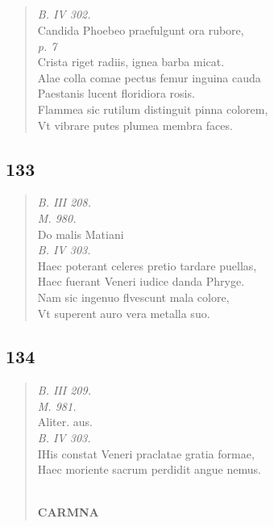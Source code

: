 \documentclass[11pt, a4paper]{report}
\begin{document}
            \subsection*{}
      \begin{verse}
      \textit{B. IV 302.} \\ Candida Phoebeo praefulgunt ora rubore, \\ \textit{p. 7} \\ Crista riget radiis, ignea barba micat. \\ Alae colla comae pectus femur inguina cauda \\ Paestanis lucent floridiora rosis. \\ Flammea sic rutilum distinguit pinna colorem, \\ Vt vibrare putes plumea membra faces. \\ 
      \end{verse}
  
            \subsection*{133}
      \begin{verse}
      \textit{B. III 208.} \\ \textit{M. 980.} \\ Do malis Matiani \\ \textit{B. IV 303.} \\ Haec poterant celeres pretio tardare puellas, \\ Haec fuerant Veneri iudice danda Phryge. \\ Nam sic ingenuo flvescunt mala colore, \\ Vt superent auro vera metalla suo. \\ 
      \end{verse}
  
            \subsection*{134}
      \begin{verse}
      \textit{B. III 209.} \\ \textit{M. 981.} \\ Aliter. aus. \\ \textit{B. IV 303.} \\ IHis constat Veneri praclatae gratia formae, \\ Haec moriente sacrum perdidit angue nemus. \\ 
        ﻿\pagebreak 
    \begin{center} \textbf{CARMNA} \end{center} \marginpar{[140]} 
      \end{verse}
  
\end{document}
